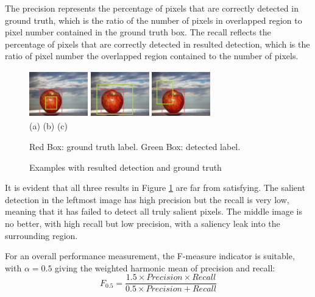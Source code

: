 \documentclass[10pt,twocolumn,letterpaper]{article}
\newcommand{\hs}{\hspace{0.58in}}
\begin{document}
The precision represents the percentage of pixels that are correctly detected in ground truth, which is the ratio of the number of pixels in overlapped region to pixel number contained in the ground truth box. The recall reflects the percentage of pixels that are correctly detected in resulted detection, which is the ratio of pixel number the overlapped region contained to the number of pixels.

\begin{figure}[h]
\begin{center}
    \includegraphics[width=1.0in,height=0.8in]{Figures/Creteria/B.jpg}
    \includegraphics[width=1.0in,height=0.8in]{Figures/Creteria/C.jpg} 
    \includegraphics[width=1.0in,height=0.8in]{Figures/Creteria/A.jpg} \\
    \footnotesize (a) \hs \hspace*{0.8cm} (b)  \hs \hspace*{0.8cm} (c)
    \caption{Examples with resulted detection and ground truth} \label{Fig:PrecisionANDRecall}
    \footnotesize Red Box: ground truth label. Green Box: detected label.
\end{center} \end{figure}

It is evident that all three results in Figure \ref{Fig:PrecisionANDRecall} are far from satisfying. The salient detection in the leftmost image has high precision but the recall is very low, meaning that it has failed to detect all truly salient pixels.  The middle image is no better, with high recall but low precision, with a saliency leak into the surrounding region.

For an overall performance measurement, the F-measure indicator is suitable, with $\alpha = 0.5$ giving the weighted harmonic mean of precision and recall:$$F_{0.5} = \frac{1.5\times Precision \times Recall}{ 0.5 \times Precision + Recall}$$
\end{document}
